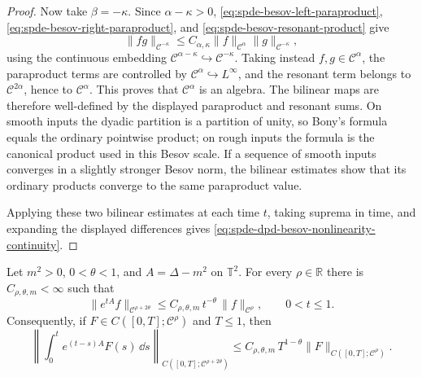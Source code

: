 \begin{proof}
Now take \(\beta=-\kappa\).  Since \(\alpha-\kappa>0\),
\eqref{eq:spde-besov-left-paraproduct},
\eqref{eq:spde-besov-right-paraproduct}, and
\eqref{eq:spde-besov-resonant-product} give
\[
  \|fg\|_{\mathcal C^{-\kappa}}
  \leq
  C_{\alpha,\kappa}
  \|f\|_{\mathcal C^\alpha}\|g\|_{\mathcal C^{-\kappa}},
\]
using the continuous embedding
\(\mathcal C^{\alpha-\kappa}\hookrightarrow\mathcal C^{-\kappa}\).
Taking instead \(f,g\in\mathcal C^\alpha\), the paraproduct terms are
controlled by \(\mathcal C^\alpha\hookrightarrow L^\infty\), and the
resonant term belongs to \(\mathcal C^{2\alpha}\), hence to
\(\mathcal C^\alpha\).  This proves that
\(\mathcal C^\alpha\) is an algebra.  The bilinear maps are therefore
well-defined by the displayed paraproduct and resonant sums.  On smooth
inputs the dyadic partition is a partition of unity, so Bony's formula
equals the ordinary pointwise product; on rough inputs the formula is the
canonical product used in this Besov scale.  If a sequence of smooth inputs
converges in a slightly stronger Besov norm, the bilinear estimates show
that its ordinary products converge to the same paraproduct value.

Applying these two bilinear estimates at each time \(t\), taking suprema in
time, and expanding the displayed differences gives
\eqref{eq:spde-dpd-besov-nonlinearity-continuity}.
\end{proof}

\begin{proposition}
\label{prop:spde-besov-heat-smoothing}
Let \(m^2>0\), \(0<\theta<1\), and
\(A=\Delta-m^2\) on \(\mathbb T^2\).  For every \(\rho\in\mathbb R\)
there is \(C_{\rho,\theta,m}<\infty\) such that
\begin{equation}
  \|e^{tA}f\|_{\mathcal C^{\rho+2\theta}}
  \leq
  C_{\rho,\theta,m}\,
  t^{-\theta}\,
  \|f\|_{\mathcal C^\rho},
  \qquad 0<t\leq1.
  \label{eq:spde-besov-heat-smoothing}
\end{equation}
Consequently, if \(F\in C([0,T];\mathcal C^\rho)\) and \(T\leq1\), then
\[
  \left\|
    \int_0^t e^{(t-s)A}F(s)\,\dd s
  \right\|_{C([0,T];\mathcal C^{\rho+2\theta})}
  \leq
  C_{\rho,\theta,m}\,
  T^{1-\theta}
  \|F\|_{C([0,T];\mathcal C^\rho)} .
\]
\end{proposition}

